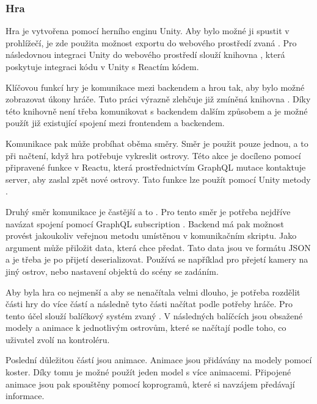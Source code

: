 \subsubsection{Hra}
Hra je vytvořena pomocí herního enginu Unity. Aby bylo možné ji spustit v prohlížečí, je zde použita možnost exportu do webového prostředí zvaná .
Pro následovnou integraci Unity do webového prostředí slouží knihovna \cite{react-unity-webgl}, která poskytuje integraci kódu v Unity s Reactím kódem.

Klíčovou funkcí hry je komunikace mezi backendem a hrou tak, aby bylo možné zobrazovat úkony hráče. Tuto práci výrazně zlehčuje již zmíněná knihovna \cite{react-unity-webgl}. Díky této knihovně není třeba komunikovat s backendem dalším způsobem a je možné použít již existující spojení mezi frontendem a backendem.\par
Komunikace pak může probíhat oběma směry. Směr  je použit pouze jednou, a to při načtení, když hra potřebuje vykreslit ostrovy. Této akce je docíleno pomocí připravené funkce v Reactu, která prostřednictvím GraphQL mutace  kontaktuje server, aby zaslal zpět nové ostrovy. Tato funkce lze použít pomocí Unity metody .\par
Druhý směr komunikace je častější a to . Pro tento směr je potřeba nejdříve navázat spojení pomocí GraphQL subscription . Backend má pak možnost provést jakoukoliv veřejnou metodu umístěnou v komunikačním skriptu. Jako argument může přiložit data, která chce předat. Tato data jsou ve formátu JSON a je třeba je po přijetí deserializovat. Používá se například pro přejetí kamery na jiný ostrov, nebo nastavení objektů do scény se zadáním.

Aby byla hra co nejmenší a aby se nenačítala velmi dlouho, je potřeba rozdělit části hry do více částí a následně tyto části načítat podle potřeby hráče. Pro tento účel slouží balíčkový systém zvaný \cite{AssetBundle}. V následných balíčcích jsou obsažené modely a animace k jednotlivým ostrovům, které se načítají podle toho, co uživatel zvolí na kontroléru.

Poslední důležitou částí jsou animace. Animace jsou přidávány na modely pomocí koster. Díky tomu je možné použít jeden model s více animacemi. Připojené animace jsou pak spouštěny pomocí koprogramů, které si navzájem předávají informace. 
